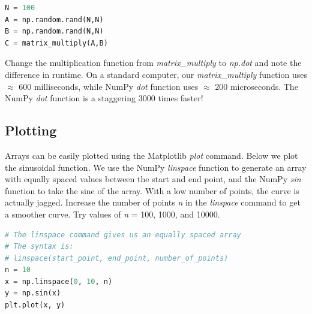 \documentclass[a4paper , 12pt]{book}
\begin{document}
\begin{center}
\begin{lstlisting}[language=Python, frame=single]
%%timeit
N = 100
A = np.random.rand(N,N)
B = np.random.rand(N,N)
C = matrix_multiply(A,B)
\end{lstlisting}
\end{center}

Change the multiplication function from \textit{matrix\_multiply} to \textit{np.dot} and note the difference in runtime. On a standard computer, our \textit{matrix\_multiply} function uses $\approx$ 600 milliseconds, while NumPy \textit{dot} function uses $\approx$ 200 microseconds. The NumPy \textit{dot} function is a staggering 3000 times faster!

\subsection{Plotting}

Arrays can be easily plotted using the Matplotlib \textit{plot} command. Below we plot the sinusoidal function. We use the NumPy \textit{linspace} function to generate an array with equally spaced values between the start and end point, and the NumPy \textit{sin} function to take the sine of the array. With a low number of points, the curve is actually jagged. Increase the number of points \textit{n} in the \textit{linspace} command to get a smoother curve. Try values of \textit{n} = 100, 1000, and 10000.

\begin{center}
\begin{lstlisting}[language=Python, frame=single]
# The linspace command gives us an equally spaced array
# The syntax is: 
# linspace(start_point, end_point, number_of_points)
n = 10
x = np.linspace(0, 10, n)
y = np.sin(x)
plt.plot(x, y)
\end{lstlisting}
\end{center}
\end{document}
